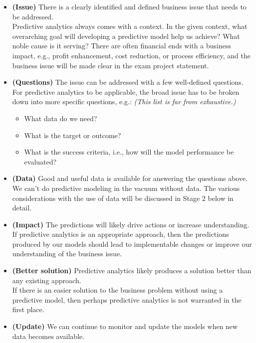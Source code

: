 \documentclass[
  12pt,
]{krantz}
\providecommand{\tightlist}{%
  \setlength{\itemsep}{0pt}\setlength{\parskip}{0pt}}
\renewenvironment{quote}{\begin{VF}}{\end{VF}}
\begin{document}
\begin{itemize}
\item
  \textbf{(Issue)} There is a clearly identified and defined business issue that
  needs to be addressed.\\
  Predictive analytics always comes with a context. In the given context, what
  overarching goal will developing a predictive model help us achieve? What
  noble cause is it serving? There are often financial ends with a business
  impact, e.g., profit enhancement, cost reduction, or process efficiency, and
  the business issue will be made clear in the exam project statement.
\item
  \textbf{(Questions)} The issue can be addressed with a few well-defined
  questions.\\
  For predictive analytics to be applicable, the broad issue has to be broken
  down into more specific questions, e.g.: \emph{(This list is far from
  exhaustive.)}

  \begin{quote}
  \begin{itemize}
  \tightlist
  \item
    What data do we need?
  \item
    What is the target or outcome?
  \item
    What is the success criteria, i.e., how will the model performance be
    evaluated?
  \end{itemize}
  \end{quote}
\item
  \textbf{(Data)} Good and useful data is available for answering the questions
  above.\\
  We can't do predictive modeling in the vacuum without data. The various
  considerations with the use of data will be discussed in Stage 2 below in
  detail.
\item
  \textbf{(Impact)} The predictions will likely drive actions or increase
  understanding.\\
  If predictive analytics is an appropriate approach, then the predictions
  produced by our models should lead to implementable changes or improve our
  understanding of the business issue.
\item
  \textbf{(Better solution)} Predictive analytics likely produces a solution better
  than any existing approach.\\
  If there is an easier solution to the business problem without using a
  predictive model, then perhaps predictive analytics is not warranted in the
  first place.
\item
  \textbf{(Update)} We can continue to monitor and update the models when new data
  becomes available.
\end{itemize}
\end{document}

